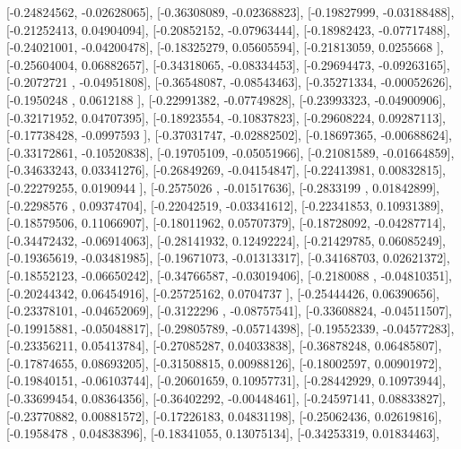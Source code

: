 \documentclass{article}
\begin{document}
       [-0.24824562, -0.02628065],
       [-0.36308089, -0.02368823],
       [-0.19827999, -0.03188488],
       [-0.21252413,  0.04904094],
       [-0.20852152, -0.07963444],
       [-0.18982423, -0.07717488],
       [-0.24021001, -0.04200478],
       [-0.18325279,  0.05605594],
       [-0.21813059,  0.0255668 ],
       [-0.25604004,  0.06882657],
       [-0.34318065, -0.08334453],
       [-0.29694473, -0.09263165],
       [-0.2072721 , -0.04951808],
       [-0.36548087, -0.08543463],
       [-0.35271334, -0.00052626],
       [-0.1950248 ,  0.0612188 ],
       [-0.22991382, -0.07749828],
       [-0.23993323, -0.04900906],
       [-0.32171952,  0.04707395],
       [-0.18923554, -0.10837823],
       [-0.29608224,  0.09287113],
       [-0.17738428, -0.0997593 ],
       [-0.37031747, -0.02882502],
       [-0.18697365, -0.00688624],
       [-0.33172861, -0.10520838],
       [-0.19705109, -0.05051966],
       [-0.21081589, -0.01664859],
       [-0.34633243,  0.03341276],
       [-0.26849269, -0.04154847],
       [-0.22413981,  0.00832815],
       [-0.22279255,  0.0190944 ],
       [-0.2575026 , -0.01517636],
       [-0.2833199 ,  0.01842899],
       [-0.2298576 ,  0.09374704],
       [-0.22042519, -0.03341612],
       [-0.22341853,  0.10931389],
       [-0.18579506,  0.11066907],
       [-0.18011962,  0.05707379],
       [-0.18728092, -0.04287714],
       [-0.34472432, -0.06914063],
       [-0.28141932,  0.12492224],
       [-0.21429785,  0.06085249],
       [-0.19365619, -0.03481985],
       [-0.19671073, -0.01313317],
       [-0.34168703,  0.02621372],
       [-0.18552123, -0.06650242],
       [-0.34766587, -0.03019406],
       [-0.2180088 , -0.04810351],
       [-0.20244342,  0.06454916],
       [-0.25725162,  0.0704737 ],
       [-0.25444426,  0.06390656],
       [-0.23378101, -0.04652069],
       [-0.3122296 , -0.08757541],
       [-0.33608824, -0.04511507],
       [-0.19915881, -0.05048817],
       [-0.29805789, -0.05714398],
       [-0.19552339, -0.04577283],
       [-0.23356211,  0.05413784],
       [-0.27085287,  0.04033838],
       [-0.36878248,  0.06485807],
       [-0.17874655,  0.08693205],
       [-0.31508815,  0.00988126],
       [-0.18002597,  0.00901972],
       [-0.19840151, -0.06103744],
       [-0.20601659,  0.10957731],
       [-0.28442929,  0.10973944],
       [-0.33699454,  0.08364356],
       [-0.36402292, -0.00448461],
       [-0.24597141,  0.08833827],
       [-0.23770882,  0.00881572],
       [-0.17226183,  0.04831198],
       [-0.25062436,  0.02619816],
       [-0.1958478 ,  0.04838396],
       [-0.18341055,  0.13075134],
       [-0.34253319,  0.01834463],
\end{document}
